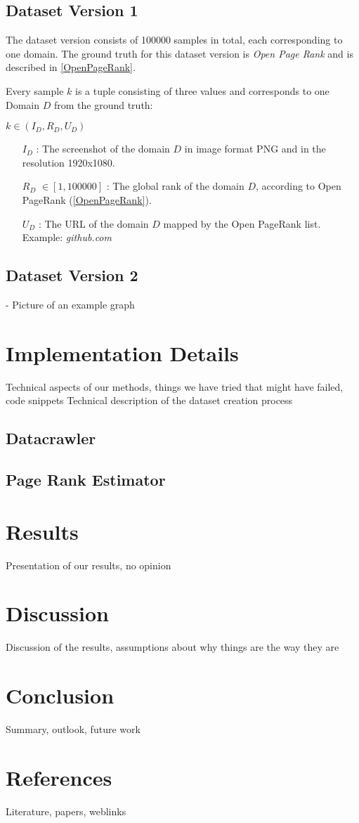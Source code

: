 \documentclass{article}
\begin{document}
\subsection{Dataset Version 1}
The dataset version consists of 100000 samples in total, each corresponding to one domain. The ground truth for this dataset version is \textit{Open Page Rank} and is described in \ref{OpenPageRank}.

Every sample $k$ is a tuple consisting of three values and corresponds to one Domain $D$ from the ground truth:

\begin{center}
 $ k \in (I_D, R_D, U_D)$
\begin{itemize}
	\item[$I_D$]: The screenshot of the domain $D$ in image format PNG and in the resolution 1920x1080.
	\item[$R_D$] $\in [1, 100000]$ : The global rank of the domain $D$, according to Open PageRank (\ref{OpenPageRank}). 
	\item[$U_D$]: The URL of the domain $D$ mapped by the Open PageRank list. Example: \textit{github.com}
\end{itemize}

\end{center}

\subsection{Dataset Version 2}
- Picture of an example graph

\section{Implementation Details}
Technical aspects of our methods, things we have tried that might have failed, code snippets
Technical description of the dataset creation process
\subsection{Datacrawler}
\subsection{Page Rank Estimator}
\section{Results}
Presentation of our results, no opinion

\section{Discussion}
Discussion of the results, assumptions about why things are the way they are

\section{Conclusion}
Summary, outlook, future work

\section{References}
Literature, papers, weblinks
\printbibliography
\end{document}
